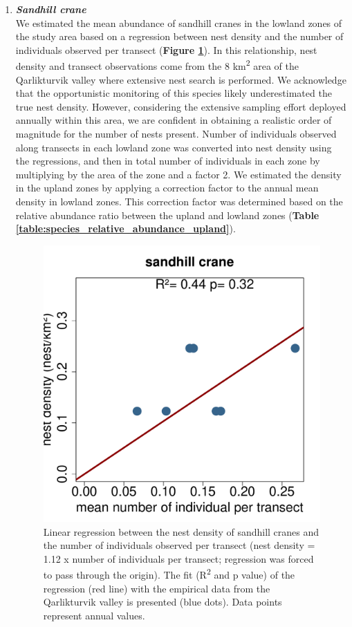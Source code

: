 \documentclass[a4paper,twoside,12pt]{article}
\begin{document}
\begin{enumerate}[label=\alph*.]
        	\item[] \textit{\textbf{Sandhill crane}}\\
        	We estimated the mean abundance of sandhill cranes in the lowland zones of the study area based on a regression between nest density and the number of individuals observed per transect (\textbf{Figure \ref{figure:sacr}}). In this relationship, nest density and transect observations come from the 8 km\textsuperscript{2} area of the Qarlikturvik valley where extensive nest search is performed. We acknowledge that the opportunistic monitoring of this species likely underestimated the true nest density. However, considering the extensive sampling effort deployed annually within this area, we are confident in obtaining a realistic order of magnitude for the number of nests present. Number of individuals observed along transects in each lowland zone was converted into nest density using the regressions, and then in total number of individuals in each zone by multiplying by the area of the zone and a factor 2. We estimated the density in the upland zones by applying a correction factor to the annual mean density in lowland zones. This correction factor was determined based on the relative abundance ratio between the upland and lowland zones (\textbf{Table \ref{table:species_relative_abundance_upland}}). 
\begin{figure}[H]
\centering
\includegraphics[width=0.5\linewidth]{figures/sandhill_crane_nest_transects.pdf} 
\caption{Linear regression between the nest density of sandhill cranes and the number of individuals observed per transect (nest density = 1.12 x number of individuals per transect; regression was forced to pass through the origin). The fit (R\textsuperscript{2} and p value) of the regression (red line) with the empirical data from the Qarlikturvik valley is presented (blue dots). Data points represent annual values.}
\label{figure:sacr}
\end{figure}


\end{enumerate}
\end{document}
